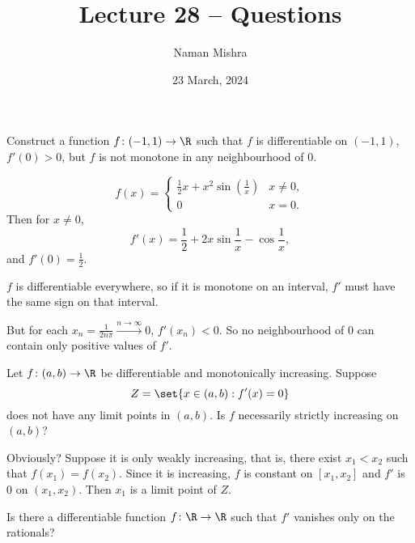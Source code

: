 \documentclass[12pt]{article}
\title{Lecture 28 -- Questions}
\author{Naman Mishra}
\date{23 March, 2024}
\begin{document}
\maketitle

\begin{problem*}
    Construct a function $f\colon (-1, 1) \to \R$ such that $f$ is
    differentiable on $(-1, 1)$, $f'(0) > 0$, but $f$ is not monotone in
    any neighbourhood of $0$.
\end{problem*}
\begin{solution}
    \[
        f(x) = \begin{cases}
            \frac12 x + x^2\sin\left(\frac{1}{x}\right) & x \neq 0, \\
            0 & x = 0.
        \end{cases}
    \] Then for $x \ne 0$, \[
        f'(x) = \frac12 + 2x \sin \frac1x - \cos \frac1x,
    \] and $f'(0) = \frac12$.

    $f$ is differentiable everywhere, so if it is monotone on an interval,
    $f'$ must have the same sign on that interval.

    But for each $x_n = \frac1{2n\pi} \xrightarrow{n \to \infty} 0$,
    $f'(x_n) < 0$.
    So no neighbourhood of $0$ can contain only positive values of $f'$.
\end{solution}

\begin{problem*}
    Let $f\colon (a, b) \to \R$ be differentiable and monotonically
    increasing.
    Suppose \[
        Z = \set{x \in (a, b) : f'(x) = 0}
    \] does not have any limit points in $(a, b)$.
    Is $f$ necessarily strictly increasing on $(a, b)$?
\end{problem*}
\begin{solution}
    Obviously?
    Suppose it is only weakly increasing, that is,
    there exist $x_1 < x_2$ such that $f(x_1) = f(x_2)$.
    Since it is increasing, $f$ is constant on $[x_1, x_2]$ and
    $f'$ is $0$ on $(x_1, x_2)$.
    Then $x_1$ is a limit point of $Z$.
\end{solution}

\begin{problem*}
    Is there a differentiable function $f\colon \R \to \R$ such that
    $f'$ vanishes only on the rationals?
\end{problem*}
\end{document}
